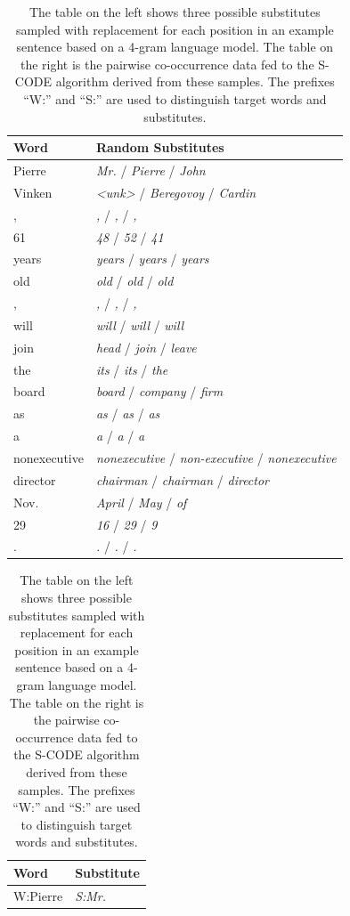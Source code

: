 \begin{table}[ht]
  \caption{The table on the left shows three possible substitutes
    sampled with replacement for each position in an example sentence
    based on a 4-gram language model.  The table on the right is the
    pairwise co-occurrence data fed to the S-CODE algorithm derived
    from these samples.  The prefixes ``W:'' and ``S:'' are used to
    distinguish target words and substitutes.}
\begin{tabular}{|ll|} \hline
\textbf{Word} & \textbf{Random Substitutes}\\
\hline
Pierre & \textit{Mr.}  / \textit{Pierre} /  \textit{John}\\
Vinken & \textit{<unk>} / \textit{Beregovoy} / \textit{Cardin}\\
, & \textit{,} / \textit{,} / \textit{,}\\
61 & \textit{48} / \textit{52} / \textit{41}\\
years & \textit{years} /  \textit{years} /  \textit{years}\\
old & \textit{old} /  \textit{old} /  \textit{old}\\
, & \textit{,} /  \textit{,} /  \textit{,}\\
will & \textit{will} /  \textit{will} /  \textit{will}\\
join & \textit{head} /  \textit{join} /  \textit{leave}\\
the  & \textit{its} /  \textit{its} /  \textit{the}\\
board & \textit{board} /  \textit{company} / \textit{firm}\\
as & \textit{as} / \textit{as} / \textit{as}\\
a & \textit{a} / \textit{a} / \textit{a}\\
nonexecutive & \textit{nonexecutive} / \textit{non-executive} / \textit{nonexecutive}\\
director & \textit{chairman} / \textit{chairman} / \textit{director}\\
Nov. & \textit{April} / \textit{May} / \textit{of}\\
29 & \textit{16} /  \textit{29} / \textit{9}\\
. & \textit{.}  / \textit{.} / \textit{.}\\
\hline
\end{tabular}
\quad
\begin{tabular}{|ll|}
\hline
\textbf{Word} & \textbf{Substitute}\\
\hline
W:Pierre & \textit{S:Mr.}\\

\end{tabular}
\end{table}

